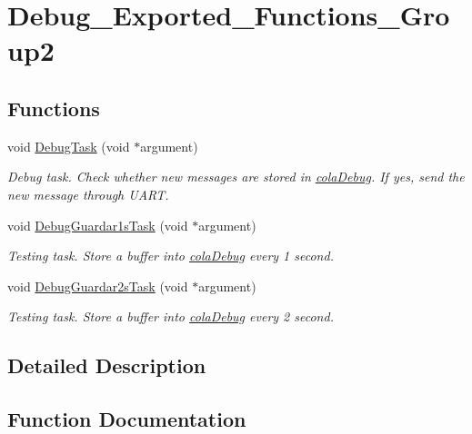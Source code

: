 \hypertarget{group___debug___exported___functions___group2}{}\section{Debug\+\_\+\+Exported\+\_\+\+Functions\+\_\+\+Group2}
\label{group___debug___exported___functions___group2}
\subsection*{Functions}
\begin{DoxyCompactItemize}
\item 
void \hyperlink{group___debug___exported___functions___group2_ga0e7fca846e34e06a1f62249fe8a30a44}{Debug\+Task} (void $\ast$argument)
\begin{DoxyCompactList}\small\item\em Debug task. Check whether new messages are stored in \hyperlink{group___cola_ga314fd637d927bd6a2551e119de623aa5}{cola\+Debug}. If yes, send the new message through U\+A\+RT. \end{DoxyCompactList}\item 
void \hyperlink{group___debug___exported___functions___group2_ga5e54537eed1694dae3ea8e6cce3f9b3a}{Debug\+Guardar1s\+Task} (void $\ast$argument)
\begin{DoxyCompactList}\small\item\em Testing task. Store a buffer into \hyperlink{group___cola_ga314fd637d927bd6a2551e119de623aa5}{cola\+Debug} every 1 second. \end{DoxyCompactList}\item 
void \hyperlink{group___debug___exported___functions___group2_gadc8fe8277ada7992dddff220a145eb5f}{Debug\+Guardar2s\+Task} (void $\ast$argument)
\begin{DoxyCompactList}\small\item\em Testing task. Store a buffer into \hyperlink{group___cola_ga314fd637d927bd6a2551e119de623aa5}{cola\+Debug} every 2 second. \end{DoxyCompactList}\end{DoxyCompactItemize}


\subsection{Detailed Description}


\subsection{Function Documentation}

